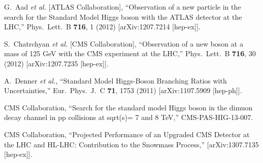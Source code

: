 \documentclass[10pt]{article}
\begin{document}
\begin{thebibliography}{99}


  G.~Aad {\it et al.}  [ATLAS Collaboration],
  ``Observation of a new particle in the search for the Standard Model Higgs boson with the ATLAS detector at the LHC,''
  Phys.\ Lett.\ B {\bf 716}, 1 (2012)
  [arXiv:1207.7214 [hep-ex]].
  
  S.~Chatrchyan {\it et al.}  [CMS Collaboration],
  ``Observation of a new boson at a mass of 125 GeV with the CMS experiment at the LHC,''
  Phys.\ Lett.\ B {\bf 716}, 30 (2012)
  [arXiv:1207.7235 [hep-ex]].


  A.~Denner {\it et al.},
  ``Standard Model Higgs-Boson Branching Ratios with Uncertainties,''
  Eur.\ Phys.\ J.\ C {\bf 71}, 1753 (2011)
  [arXiv:1107.5909 [hep-ph]].


  CMS Collaboration,
  ``Search for the standard model Higgs boson in the dimuon decay channel 
in pp collisions at sqrt(s)= 7 and 8 TeV,''
  CMS-PAS-HIG-13-007.


  CMS Collaboration,
  ``Projected Performance of an Upgraded CMS Detector at the LHC and HL-LHC: Contribution to the Snowmass Process,''
  [arXiv:1307.7135 [hep-ex]].

\end{thebibliography}

 
\end{document}
